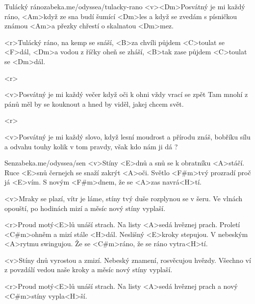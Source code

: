 \begin{song}[Nedvědi]{31}{Tulácký ráno}{zabeka.me/odyssea/tulacky-rano}
	<v><Dm>Posvátný je mi každý ráno,
	<Am>když ze sna budí šumící <Dm>les
	a když se zvedám s písničkou známou
	<Am>a přezky chřestí o skalnatou <Dm>mez.

	<r>Tulácký ráno, na kemp se snáší,
	<B>za chvíli půjdem <C>toulat se <F>dál,
	<Dm>a vodou z říčky oheň se zháší,
	<B>tak zase půjdem <C>toulat se <Dm>dál.

	<r>

	<v>Posvátný je mi každý večer
	když oči k ohni vždy vrací se zpět
	Tam mnohí z pánů měl by se kouknout
	a hned by viděl, jakej chcem svět.

	<r>

	<v>Posvátný je mi každý slovo,
	když lesní moudrost a přírodu znáš,
	bobříku sílu a odvahu touhy
	kolik v tom pravdy, však kdo nám ji dá ?
\end{song}
\begin{song}[Lucie]{32}{Sen}{zabeka.me/odyssea/sen}
	<v>Stíny <E>dnů a snů se k obratníku <A>stáčí.
	Ruce <E>snů černejch se snaží zakrýt <A>oči.
	Světlo <F#m>tvý prozradí proč já <E>vím.
	S novým <F#m>dnem, že se <A>zas navrá<H>tí.

	<v>Mraky se plazí, vítr je láme,
	stíny tvý duše rozplynou se v šeru.
	Ve vlnách opouští, po hodinách mizí
	a měsíc nový stíny vyplaší.

	<r>Proud motý<E>lů unáší strach.
	Na listy <A>sedá hvěznej prach.
	Proletí <C#m>ohněm a mizí stále <H>dál.
	Neslišný <E>kroky stepujou.
	V nebeským <A>rytmu swingujou.
	Že se <C#m>ráno, že se ráno vytra<H>tí.

	<v>Stíny dnů vyrostou a zmizí.
	Nebeský znamení, rosvěcujou hvězdy.
	Všechno ví z povzdálí vedou naše kroky
	a měsíc nový stíny vyplaší.

	<r>Proud motý<E>lů unáší strach.
	Na listy <A>sedá hvěznej prach
	a nový <C#m>stíny vypla<H>ší.
\end{song}
